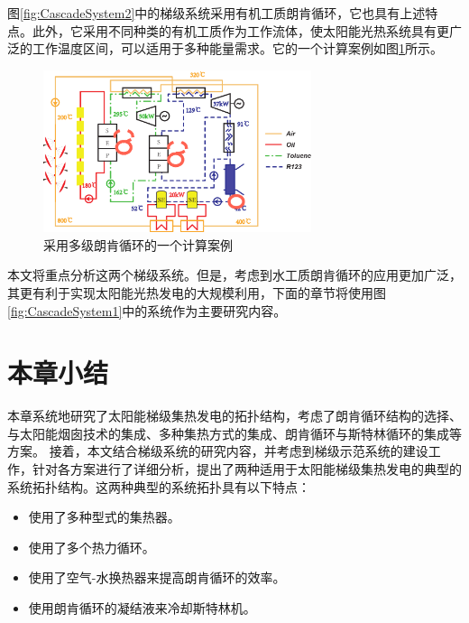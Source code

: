 图\ref{fig:CascadeSystem2}中的梯级系统采用有机工质朗肯循环，它也具有上述特点。此外，它采用不同种类的有机工质作为工作流体，使太阳能光热系统具有更广泛的工作温度区间，可以适用于多种能量需求。它的一个计算案例如图\ref{fig:Ex_CascadeSystem2}所示。
\begin{figure}[htbp]
\centering 
\includegraphics[width=0.7\textwidth]{fig/Ex_CascadeSystem2}
\caption{采用多级朗肯循环的一个计算案例}
\label{fig:Ex_CascadeSystem2}
\end{figure}
本文将重点分析这两个梯级系统。但是，考虑到水工质朗肯循环的应用更加广泛，其更有利于实现太阳能光热发电的大规模利用，下面的章节将使用图\ref{fig:CascadeSystem1}中的系统作为主要研究内容。

\newpage
\section{本章小结}
本章系统地研究了太阳能梯级集热发电的拓扑结构，考虑了朗肯循环结构的选择、与太阳能烟囱技术的集成、多种集热方式的集成、朗肯循环与斯特林循环的集成等方案。
接着，本文结合梯级系统的研究内容，并考虑到梯级示范系统的建设工作，针对各方案进行了详细分析，提出了两种适用于太阳能梯级集热发电的典型的系统拓扑结构。这两种典型的系统拓扑具有以下特点：

\begin{itemize}
  \item 使用了多种型式的集热器。
  \item 使用了多个热力循环。
  \item 使用了空气-水换热器来提高朗肯循环的效率。
  \item 使用朗肯循环的凝结液来冷却斯特林机。
\end{itemize}

